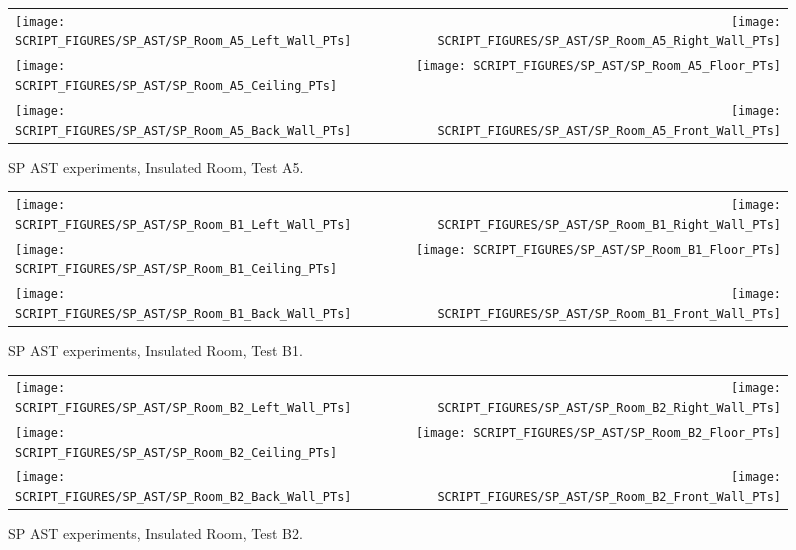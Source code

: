 \begin{figure}[p]
\begin{tabular*}{\textwidth}{l@{\extracolsep{\fill}}r}
\texttt{[image: SCRIPT\_FIGURES/SP\_AST/SP\_Room\_A5\_Left\_Wall\_PTs]} &  \texttt{[image: SCRIPT\_FIGURES/SP\_AST/SP\_Room\_A5\_Right\_Wall\_PTs]}  \\
\texttt{[image: SCRIPT\_FIGURES/SP\_AST/SP\_Room\_A5\_Ceiling\_PTs]}   &  \texttt{[image: SCRIPT\_FIGURES/SP\_AST/SP\_Room\_A5\_Floor\_PTs]}  \\
\texttt{[image: SCRIPT\_FIGURES/SP\_AST/SP\_Room\_A5\_Back\_Wall\_PTs]} &  \texttt{[image: SCRIPT\_FIGURES/SP\_AST/SP\_Room\_A5\_Front\_Wall\_PTs]}
\end{tabular*}
\caption[SP AST experiments, Insulated Room, Test A5]{SP AST experiments, Insulated Room, Test A5.}
\label{SP_Room_A5_PTs}
\end{figure}

\begin{figure}[p]
\begin{tabular*}{\textwidth}{l@{\extracolsep{\fill}}r}
\texttt{[image: SCRIPT\_FIGURES/SP\_AST/SP\_Room\_B1\_Left\_Wall\_PTs]} &  \texttt{[image: SCRIPT\_FIGURES/SP\_AST/SP\_Room\_B1\_Right\_Wall\_PTs]}  \\
\texttt{[image: SCRIPT\_FIGURES/SP\_AST/SP\_Room\_B1\_Ceiling\_PTs]}   &  \texttt{[image: SCRIPT\_FIGURES/SP\_AST/SP\_Room\_B1\_Floor\_PTs]}  \\
\texttt{[image: SCRIPT\_FIGURES/SP\_AST/SP\_Room\_B1\_Back\_Wall\_PTs]} &  \texttt{[image: SCRIPT\_FIGURES/SP\_AST/SP\_Room\_B1\_Front\_Wall\_PTs]}
\end{tabular*}
\caption[SP AST experiments, Insulated Room, Test B1]{SP AST experiments, Insulated Room, Test B1.}
\label{SP_Room_B1_PTs}
\end{figure}

\begin{figure}[p]
\begin{tabular*}{\textwidth}{l@{\extracolsep{\fill}}r}
\texttt{[image: SCRIPT\_FIGURES/SP\_AST/SP\_Room\_B2\_Left\_Wall\_PTs]} &  \texttt{[image: SCRIPT\_FIGURES/SP\_AST/SP\_Room\_B2\_Right\_Wall\_PTs]}  \\
\texttt{[image: SCRIPT\_FIGURES/SP\_AST/SP\_Room\_B2\_Ceiling\_PTs]}   &  \texttt{[image: SCRIPT\_FIGURES/SP\_AST/SP\_Room\_B2\_Floor\_PTs]}  \\
\texttt{[image: SCRIPT\_FIGURES/SP\_AST/SP\_Room\_B2\_Back\_Wall\_PTs]} &  \texttt{[image: SCRIPT\_FIGURES/SP\_AST/SP\_Room\_B2\_Front\_Wall\_PTs]}
\end{tabular*}
\caption[SP AST experiments, Insulated Room, Test B2]{SP AST experiments, Insulated Room, Test B2.}
\label{SP_Room_B2_PTs}
\end{figure}

